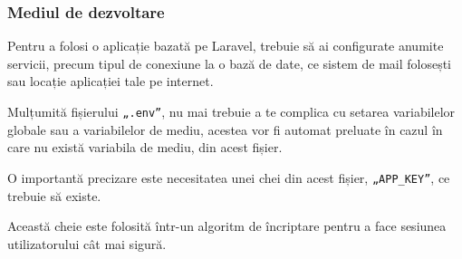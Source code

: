 	\subsubsection{Mediul de dezvoltare}

	Pentru a folosi o aplicație bazată pe Laravel, trebuie să ai configurate anumite servicii, precum tipul de conexiune la o bază de date, ce sistem de mail folosești sau locație aplicației tale pe internet.

	Mulțumită fișierului \verb|„.env”|, nu mai trebuie a te complica cu setarea variabilelor globale sau a variabilelor de mediu, acestea vor fi automat preluate în cazul în care nu există variabila de mediu, din acest fișier.

	O importantă precizare este necesitatea unei chei din acest fișier, \verb|„APP_KEY”|, ce trebuie să existe.

	Această cheie este folosită într-un algoritm de încriptare pentru a face sesiunea utilizatorului cât mai sigură.
